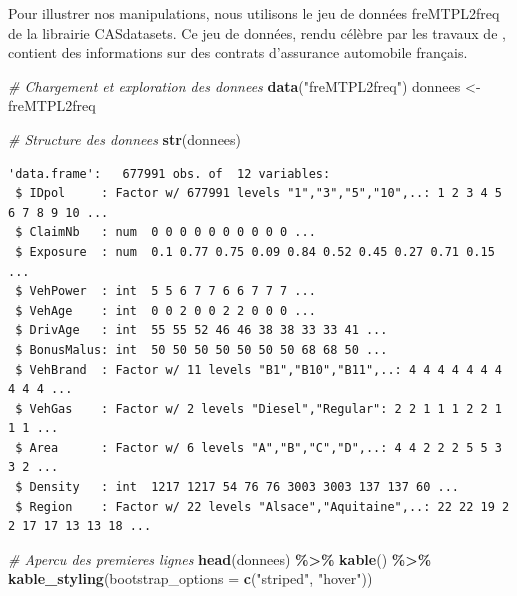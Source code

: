 \documentclass[
  french,
]{book}
\newenvironment{Shaded}{\begin{snugshade}}{\end{snugshade}}
\newcommand{\AttributeTok}[1]{\textcolor[rgb]{0.13,0.29,0.53}{#1}}
\newcommand{\CommentTok}[1]{\textcolor[rgb]{0.56,0.35,0.01}{\textit{#1}}}
\newcommand{\FunctionTok}[1]{\textcolor[rgb]{0.13,0.29,0.53}{\textbf{#1}}}
\newcommand{\NormalTok}[1]{#1}
\newcommand{\OtherTok}[1]{\textcolor[rgb]{0.56,0.35,0.01}{#1}}
\newcommand{\SpecialCharTok}[1]{\textcolor[rgb]{0.81,0.36,0.00}{\textbf{#1}}}
\newcommand{\StringTok}[1]{\textcolor[rgb]{0.31,0.60,0.02}{#1}}
\theoremstyle{definition}
\theoremstyle{definition}
\theoremstyle{definition}
\theoremstyle{definition}
\theoremstyle{remark}
\begin{document}
Pour illustrer nos manipulations, nous utilisons le jeu de données freMTPL2freq de la librairie CASdatasets. Ce jeu de données, rendu célèbre par les travaux de \citet{denuit2019effective}, contient des informations sur des contrats d'assurance automobile français.

\begin{Shaded}
\begin{Highlighting}[]
\CommentTok{\# Chargement et exploration des donnees}
\FunctionTok{data}\NormalTok{(}\StringTok{"freMTPL2freq"}\NormalTok{)}
\NormalTok{donnees }\OtherTok{\textless{}{-}}\NormalTok{ freMTPL2freq}

\CommentTok{\# Structure des donnees}
\FunctionTok{str}\NormalTok{(donnees)}
\end{Highlighting}
\end{Shaded}

\begin{verbatim}
'data.frame':   677991 obs. of  12 variables:
 $ IDpol     : Factor w/ 677991 levels "1","3","5","10",..: 1 2 3 4 5 6 7 8 9 10 ...
 $ ClaimNb   : num  0 0 0 0 0 0 0 0 0 0 ...
 $ Exposure  : num  0.1 0.77 0.75 0.09 0.84 0.52 0.45 0.27 0.71 0.15 ...
 $ VehPower  : int  5 5 6 7 7 6 6 7 7 7 ...
 $ VehAge    : int  0 0 2 0 0 2 2 0 0 0 ...
 $ DrivAge   : int  55 55 52 46 46 38 38 33 33 41 ...
 $ BonusMalus: int  50 50 50 50 50 50 50 68 68 50 ...
 $ VehBrand  : Factor w/ 11 levels "B1","B10","B11",..: 4 4 4 4 4 4 4 4 4 4 ...
 $ VehGas    : Factor w/ 2 levels "Diesel","Regular": 2 2 1 1 1 2 2 1 1 1 ...
 $ Area      : Factor w/ 6 levels "A","B","C","D",..: 4 4 2 2 2 5 5 3 3 2 ...
 $ Density   : int  1217 1217 54 76 76 3003 3003 137 137 60 ...
 $ Region    : Factor w/ 22 levels "Alsace","Aquitaine",..: 22 22 19 2 2 17 17 13 13 18 ...
\end{verbatim}

\begin{Shaded}
\begin{Highlighting}[]
\CommentTok{\# Apercu des premieres lignes}
\FunctionTok{head}\NormalTok{(donnees) }\SpecialCharTok{\%\textgreater{}\%}
  \FunctionTok{kable}\NormalTok{() }\SpecialCharTok{\%\textgreater{}\%}
  \FunctionTok{kable\_styling}\NormalTok{(}\AttributeTok{bootstrap\_options =} \FunctionTok{c}\NormalTok{(}\StringTok{"striped"}\NormalTok{, }\StringTok{"hover"}\NormalTok{))}
\end{Highlighting}
\end{Shaded}
\end{document}
